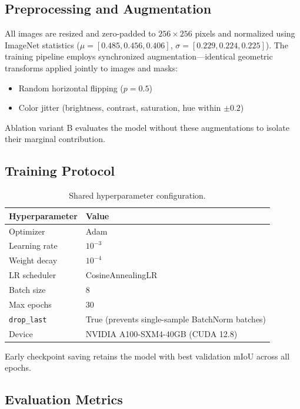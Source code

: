 \documentclass[11pt,a4paper]{article}
\begin{document}
\subsection{Preprocessing and Augmentation}

All images are resized and zero-padded to $256 \times 256$ pixels and normalized using ImageNet statistics ($\mu = [0.485, 0.456, 0.406]$, $\sigma = [0.229, 0.224, 0.225]$). The training pipeline employs synchronized augmentation---identical geometric transforms applied jointly to images and masks:
\begin{itemize}
  \item Random horizontal flipping ($p = 0.5$)
  \item Color jitter (brightness, contrast, saturation, hue within $\pm 0.2$)
\end{itemize}
Ablation variant B evaluates the model without these augmentations to isolate their marginal contribution.

\subsection{Training Protocol}

\begin{table}[H]
\centering
\caption{Shared hyperparameter configuration.}
\begin{tabular}{ll}
\toprule
Hyperparameter & Value \\
\midrule
Optimizer & Adam \\
Learning rate & $10^{-3}$ \\
Weight decay & $10^{-4}$ \\
LR scheduler & CosineAnnealingLR \\
Batch size & 8 \\
Max epochs & 30 \\
\texttt{drop\_last} & True (prevents single-sample BatchNorm batches) \\
Device & NVIDIA A100-SXM4-40GB (CUDA 12.8) \\
\bottomrule
\end{tabular}
\end{table}

Early checkpoint saving retains the model with best validation mIoU across all epochs.

\subsection{Evaluation Metrics}
\end{document}
